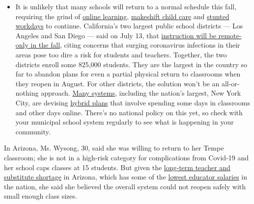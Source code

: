 \begin{itemize}
  \begin{itemize}
  \tightlist
  \item
    It is unlikely that many schools will return to a normal schedule
    this fall, requiring the grind of
    \href{https://www.nytimes.com/2020/06/05/us/coronavirus-education-lost-learning.html?action=click\&pgtype=Article\&state=default\&region=MAIN_CONTENT_3\&context=storylines_faq}{online
    learning},
    \href{https://www.nytimes.com/2020/05/29/us/coronavirus-child-care-centers.html?action=click\&pgtype=Article\&state=default\&region=MAIN_CONTENT_3\&context=storylines_faq}{makeshift
    child care} and
    \href{https://www.nytimes.com/2020/06/03/business/economy/coronavirus-working-women.html?action=click\&pgtype=Article\&state=default\&region=MAIN_CONTENT_3\&context=storylines_faq}{stunted
    workdays} to continue. California's two largest public school
    districts --- Los Angeles and San Diego --- said on July 13, that
    \href{https://www.nytimes.com/2020/07/13/us/lausd-san-diego-school-reopening.html?action=click\&pgtype=Article\&state=default\&region=MAIN_CONTENT_3\&context=storylines_faq}{instruction
    will be remote-only in the fall}, citing concerns that surging
    coronavirus infections in their areas pose too dire a risk for
    students and teachers. Together, the two districts enroll some
    825,000 students. They are the largest in the country so far to
    abandon plans for even a partial physical return to classrooms when
    they reopen in August. For other districts, the solution won't be an
    all-or-nothing approach.
    \href{https://bioethics.jhu.edu/research-and-outreach/projects/eschool-initiative/school-policy-tracker/}{Many
    systems}, including the nation's largest, New York City, are
    devising
    \href{https://www.nytimes.com/2020/06/26/us/coronavirus-schools-reopen-fall.html?action=click\&pgtype=Article\&state=default\&region=MAIN_CONTENT_3\&context=storylines_faq}{hybrid
    plans} that involve spending some days in classrooms and other days
    online. There's no national policy on this yet, so check with your
    municipal school system regularly to see what is happening in your
    community.
  \end{itemize}
\end{itemize}

In Arizona, Ms. Wysong, 30, said she was willing to return to her Tempe
classroom; she is not in a high-risk category for complications from
Covid-19 and her school caps classes at 15 students. But given the
\href{https://www.nytimes.com/2018/05/02/us/arizona-teachers-philippines.html}{long-term
teacher and substitute shortage} in Arizona, which has some of the
\href{https://blogs.edweek.org/teachers/teaching_now/2019/04/which_states_have_the_highest_and_lowest_teacher_salaries.html}{lowest
educator salaries} in the nation, she said she believed the overall
system could not reopen safely with small enough class sizes.

